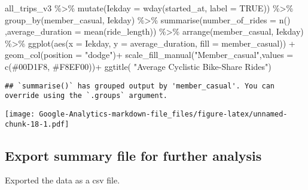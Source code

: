 \documentclass[
]{article}
\newenvironment{Shaded}{\begin{snugshade}}{\end{snugshade}}
\newcommand{\AttributeTok}[1]{\textcolor[rgb]{0.77,0.63,0.00}{#1}}
\newcommand{\ConstantTok}[1]{\textcolor[rgb]{0.00,0.00,0.00}{#1}}
\newcommand{\FunctionTok}[1]{\textcolor[rgb]{0.00,0.00,0.00}{#1}}
\newcommand{\NormalTok}[1]{#1}
\newcommand{\SpecialCharTok}[1]{\textcolor[rgb]{0.00,0.00,0.00}{#1}}
\newcommand{\StringTok}[1]{\textcolor[rgb]{0.31,0.60,0.02}{#1}}
\begin{document}
\begin{Shaded}
\begin{Highlighting}[]
\NormalTok{  all\_trips\_v3 }\SpecialCharTok{\%\textgreater{}\%} 
    \FunctionTok{mutate}\NormalTok{(}\AttributeTok{Iekday =} \FunctionTok{wday}\NormalTok{(started\_at, }\AttributeTok{label =} \ConstantTok{TRUE}\NormalTok{)) }\SpecialCharTok{\%\textgreater{}\%} 
    \FunctionTok{group\_by}\NormalTok{(member\_casual, Iekday) }\SpecialCharTok{\%\textgreater{}\%} 
    \FunctionTok{summarise}\NormalTok{(}\AttributeTok{number\_of\_rides =} \FunctionTok{n}\NormalTok{()}
\NormalTok{              ,}\AttributeTok{average\_duration =} \FunctionTok{mean}\NormalTok{(ride\_length)) }\SpecialCharTok{\%\textgreater{}\%} 
    \FunctionTok{arrange}\NormalTok{(member\_casual, Iekday)  }\SpecialCharTok{\%\textgreater{}\%} 
    \FunctionTok{ggplot}\NormalTok{(}\FunctionTok{aes}\NormalTok{(}\AttributeTok{x =}\NormalTok{ Iekday, }\AttributeTok{y =}\NormalTok{ average\_duration, }\AttributeTok{fill =}\NormalTok{ member\_casual)) }\SpecialCharTok{+}
    \FunctionTok{geom\_col}\NormalTok{(}\AttributeTok{position =} \StringTok{"dodge"}\NormalTok{)}\SpecialCharTok{+}
    \FunctionTok{scale\_fill\_manual}\NormalTok{(}\StringTok{"Member\_casual"}\NormalTok{,}\AttributeTok{values =} \FunctionTok{c}\NormalTok{(}\StringTok{\textquotesingle{}\#00D1F8\textquotesingle{}}\NormalTok{, }\StringTok{\textquotesingle{}\#F8EF00\textquotesingle{}}\NormalTok{))}\SpecialCharTok{+}
    \FunctionTok{ggtitle}\NormalTok{( }\StringTok{"Average Cyclistic Bike{-}Share Rides"}\NormalTok{)}
\end{Highlighting}
\end{Shaded}

\begin{verbatim}
## `summarise()` has grouped output by 'member_casual'. You can override using the `.groups` argument.
\end{verbatim}

\texttt{[image: Google-Analytics-markdown-file\_files/figure-latex/unnamed-chunk-18-1.pdf]}

\hypertarget{export-summary-file-for-further-analysis}{%
\subsection{Export summary file for further
analysis}\label{export-summary-file-for-further-analysis}}

Exported the data as a csv file.
\end{document}
